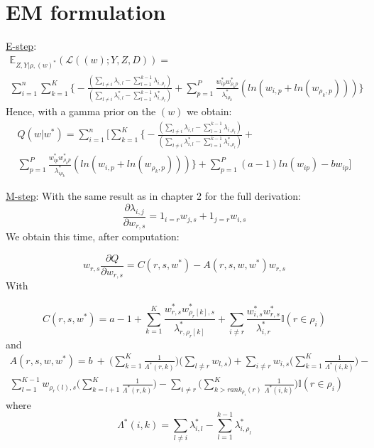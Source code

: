 \documentclass[12pt]{ociamthesis}  %
\begin{document}
	\section{EM formulation}
	
	\underline{E-step}:
	\begin{multline}
	\mathbb{E}_{Z,Y | \rho, (w)^{*}}(\mathcal{L}((w);Y,Z,D)) = \\ \sum_{i = 1}^{n} \sum_{k = 1}^{K} \bigg\{ -\frac{(\sum_{l \neq i} \lambda_{i,l} - \sum_{l = 1}^{k - 1} \lambda_{i,\rho_{l}})}{(\sum_{l \neq i} \lambda^{*}_{i,l} - \sum_{l = 1}^{k - 1} \lambda^{*}_{i,\rho_{l}})} + \sum_{p = 1}^{P} \frac{w^{*}_{ip}w^{*}_{\rho_{k}p}}{\lambda^{*}_{i\rho_{k}}} (ln(w_{i,p} + ln(w_{\rho_{k},p}))) \bigg\}
	\end{multline} Hence, with a gamma prior on the $(w)$ we obtain:
	\begin{multline}
	Q(w|w^{*}) = \sum_{i = 1}^{n} \Bigg[ \sum_{k = 1}^{K} \bigg\{ -\frac{(\sum_{l \neq i} \lambda_{i,l} - \sum_{l = 1}^{k - 1} \lambda_{i,\rho_{l}})}{(\sum_{l \neq i} \lambda^{*}_{i,l} - \sum_{l = 1}^{k - 1} \lambda^{*}_{i,\rho_{l}})} + \\ \sum_{p = 1}^{P} \frac{w^{*}_{ip}w^{*}_{\rho_{k}p}}{\lambda^{*}_{i\rho_{k}}} (ln(w_{i,p} + ln(w_{\rho_{k},p}))) \bigg\} + \sum_{p = 1}^{P} (a-1)ln(w_{ip}) - bw_{ip}  \Bigg]
	\end{multline}
	
	\underline{M-step}: With the same result as in chapter 2 for the full derivation:
	\begin{equation}
	\frac{\partial \lambda_{i,j}}{\partial w_{r,s}} = 1_{i = r} w_{j,s} + 1_{j = r} w_{i,s}
	\end{equation}
	We obtain this time, after computation:
	
	\begin{equation}
	w_{r,s} \frac{\partial Q}{\partial w_{r,s}} = C(r,s,w^{*}) - A(r,s,w,w^{*})w_{r,s}
	\end{equation}
	With
	
	\begin{equation}
	C(r,s,w^{*}) = a - 1 + \sum_{k = 1}^{K}\frac{w^{*}_{r,s}w^{*}_{\rho_{r}[k],s}}{\lambda^{*}_{r,\rho_{r}[k]}} + \sum_{i \neq r} \frac{w^{*}_{i,s}w^{*}_{r,s}}{\lambda^{*}_{i,r}} \mathbb{I}(r \in \rho_{i})
	\end{equation} and
	\begin{multline}
	A(r,s,w,w^{*}) = b \ + \ \bigg( \sum_{k = 1}^{K} \frac{1}{\Lambda^{*}(r,k)} \bigg) \bigg( \sum_{l \neq r} w_{l,s} \bigg) + \sum_{i \neq r} w_{i,s} \bigg( \sum_{k = 1}^{K} \frac{1}{\Lambda^{*}(i,k)} \bigg) - \\ \sum_{l = 1}^{K-1} w_{\rho_{r}(l), s} \bigg( \sum_{k = l+1}^{K} \frac{1}{\Lambda^{*}(r,k)} \bigg) - \sum_{i \neq r} \bigg( \sum_{k > rank_{\rho_{i}}(r)}^{K} \frac{1}{\Lambda^{*}(i,k)} \bigg)\mathbb{I}(r \in \rho_{i})
	\end{multline} where
	\begin{equation}
	\Lambda^{*}(i,k) = \sum_{l \neq i} \lambda^{*}_{i,l} - \sum_{l = 1}^{k-1} \lambda^{*}_{i,\rho_{l}}
	\end{equation}
	
\end{document}
